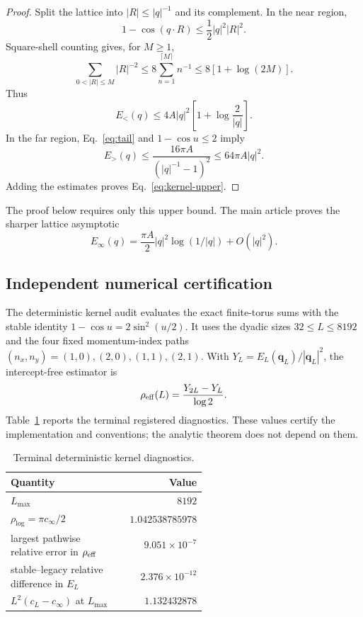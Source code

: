 \documentclass[aps,prb,preprint,notitlepage,groupedaddress,amsmath,amssymb,
               superscriptaddress,nofootinbib,floatfix]{revtex4-2}
\theoremstyle{definition}
\theoremstyle{plain}
\begin{document}
\begin{proof}
Split the lattice into $|R|\le|q|^{-1}$ and its complement.  In the near
region,
\begin{equation}
 1-\cos(q\cdot R)\le\frac12|q|^2|R|^2.
\end{equation}
Square-shell counting gives, for $M\ge1$,
\begin{equation}
 \sum_{0<|R|\le M}|R|^{-2}
 \le8\sum_{n=1}^{\lceil M\rceil}n^{-1}
 \le8[1+\log(2M)].
\end{equation}
Thus
\begin{equation}
 E_{<}(q)
 \le4A|q|^2\left[1+\log\frac2{|q|}\right].
\end{equation}
In the far region, Eq.~\eqref{eq:tail} and $1-\cos u\le2$ imply
\begin{equation}
 E_{>}(q)
 \le\frac{16\pi A}{(|q|^{-1}-1)^2}
 \le64\pi A|q|^2.
\end{equation}
Adding the estimates proves Eq.~\eqref{eq:kernel-upper}.
\end{proof}

The proof below requires only this upper bound.  The main article proves the
sharper lattice asymptotic
\begin{equation}
 E_\infty(q)=\frac{\pi A}{2}|q|^2\log(1/|q|)+O(|q|^2).
\end{equation}

\subsection{Independent numerical certification}

The deterministic kernel audit evaluates the exact finite-torus sums with
the stable identity $1-\cos u=2\sin^2(u/2)$.  It uses the dyadic sizes
$32\le L\le8192$ and the four fixed momentum-index paths
$(n_x,n_y)=(1,0),(2,0),(1,1),(2,1)$.  With
$Y_L=E_L(\bm q_L)/|\bm q_L|^2$, the intercept-free estimator is
\begin{equation}
 \rho_{\rm eff}(L)=\frac{Y_{2L}-Y_L}{\log2}.
\end{equation}
Table~\ref{tab:kernel-certification} reports the terminal registered
diagnostics.  These values certify the implementation and conventions; the
analytic theorem does not depend on them.

\begin{table}[h]
\caption{Terminal deterministic kernel diagnostics.}
\label{tab:kernel-certification}
\begin{ruledtabular}
\begin{tabular}{p{0.55\linewidth}r}
Quantity & Value\\
\hline
$L_{\max}$ & $8192$\\
$\rho_{\log}=\pi c_\infty/2$ & $1.042538785978$\\
largest pathwise relative error in $\rho_{\rm eff}$ &
$9.051\times10^{-7}$\\
stable--legacy relative difference in $E_L$ &
$2.376\times10^{-12}$\\
$L^2(c_L-c_\infty)$ at $L_{\max}$ & $1.132432878$\\
\end{tabular}
\end{ruledtabular}
\end{table}
\end{document}
